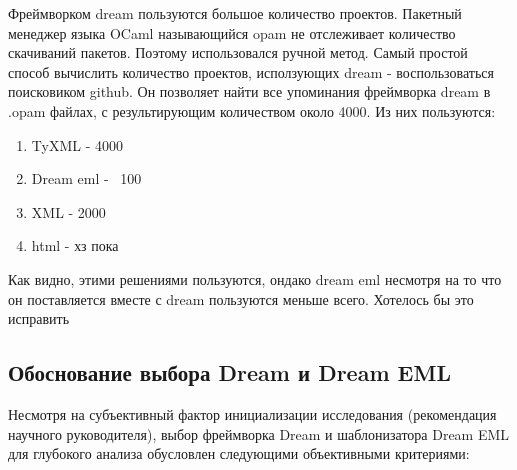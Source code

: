 
Фреймворком dream пользуются большое количество проектов.
Пакетный менеджер языка OCaml называющийся opam не отслеживает количество скачиваний пакетов. Поэтому использовался ручной метод.
Самый простой способ вычислить количество проектов, исползующих dream - воспользоваться поисковиком github.
Он позволяет найти все упоминания фреймворка dream в .opam файлах, с результирующим количеством около 4000.
Из них пользуются:

\begin{enumerate}
    \item TyXML - 4000
    \item Dream eml - ~100
    \item XML - 2000
    \item html - хз пока
\end{enumerate}


Как видно, этими решениями пользуются, ондако dream eml несмотря на то что он поставляется вместе с dream пользуются меньше всего.
Хотелось бы это исправить


\subsection*{Обоснование выбора Dream и Dream EML}
Несмотря на субъективный фактор инициализации исследования (рекомендация научного руководителя), выбор фреймворка Dream и шаблонизатора Dream EML для глубокого анализа обусловлен следующими объективными критериями:

